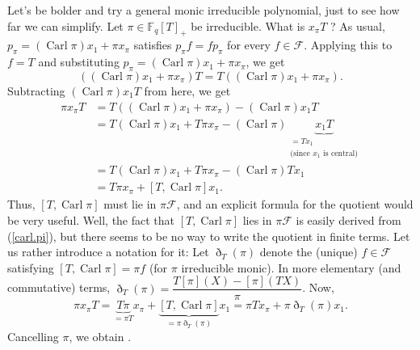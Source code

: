 \documentclass[numbers=enddot,12pt,final,onecolumn,notitlepage]{scrartcl}%
\theoremstyle{definition}
\begin{document}
Let's be bolder and try a general monic irreducible polynomial, just to see
how far we can simplify. Let $\pi\in\mathbb{F}_{q}\left[  T\right]  _{+}$ be
irreducible. What is $x_{\pi}T$ ? As usual, $p_{\pi}=\left(
\operatorname*{Carl}\pi\right)  x_{1}+\pi x_{\pi}$ satisfies $p_{\pi}%
f=fp_{\pi}$ for every $f\in\mathcal{F}$. Applying this to $f=T$ and
substituting $p_{\pi}=\left(  \operatorname*{Carl}\pi\right)  x_{1}+\pi
x_{\pi}$, we get%
\[
\left(  \left(  \operatorname*{Carl}\pi\right)  x_{1}+\pi x_{\pi}\right)
T=T\left(  \left(  \operatorname*{Carl}\pi\right)  x_{1}+\pi x_{\pi}\right)
.
\]
Subtracting $\left(  \operatorname*{Carl}\pi\right)  x_{1}T$ from here, we get%
\begin{align*}
\pi x_{\pi}T  &  =T\left(  \left(  \operatorname*{Carl}\pi\right)  x_{1}+\pi
x_{\pi}\right)  -\left(  \operatorname*{Carl}\pi\right)  x_{1}T\\
&  =T\left(  \operatorname*{Carl}\pi\right)  x_{1}+T\pi x_{\pi}-\left(
\operatorname*{Carl}\pi\right)  \underbrace{x_{1}T}_{\substack{=Tx_{1}%
\\\text{(since }x_{1}\text{ is central)}}}\\
&  =T\left(  \operatorname*{Carl}\pi\right)  x_{1}+T\pi x_{\pi}-\left(
\operatorname*{Carl}\pi\right)  Tx_{1}\\
&  =T\pi x_{\pi}+\left[  T,\operatorname*{Carl}\pi\right]  x_{1}.
\end{align*}
Thus, $\left[  T,\operatorname*{Carl}\pi\right]  $ must lie in $\pi
\mathcal{F}$, and an explicit formula for the quotient would be very useful.
Well, the fact that $\left[  T,\operatorname*{Carl}\pi\right]  $ lies in
$\pi\mathcal{F}$ is easily derived from (\ref{carl.pi}), but there seems to be
no way to write the quotient in finite terms. Let us rather introduce a
notation for it: Let $\eth_{T}\left(  \pi\right)  $ denote the (unique)
$f\in\mathcal{F}$ satisfying $\left[  T,\operatorname*{Carl}\pi\right]  =\pi
f$ (for $\pi$ irreducible monic). In more elementary (and commutative) terms,
$\eth_{T}\left(  \pi\right)  =\dfrac{T\left[  \pi\right]  \left(  X\right)
-\left[  \pi\right]  \left(  TX\right)  }{\pi}$. Now,%
\[
\pi x_{\pi}T=\underbrace{T\pi}_{=\pi T}x_{\pi}+\underbrace{\left[
T,\operatorname*{Carl}\pi\right]  }_{=\pi\eth_{T}\left(  \pi\right)  }%
x_{1}=\pi Tx_{\pi}+\pi\eth_{T}\left(  \pi\right)  x_{1}.
\]
Cancelling $\pi$, we obtain .
\end{document}
